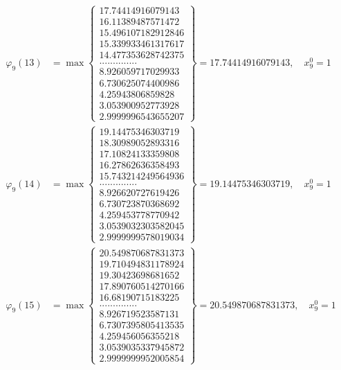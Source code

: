 \documentclass{article}
\begin{document}
\begin{align*}
  
  
  
\varphi_{9}(13) &= \max \left\{ \begin{array}{c}
17.74414916079143 \\
 16.11389487571472 \\
 15.496107182912846 \\
 15.339933461317617 \\
 14.477353628742375 \\
 .............. \\
 8.926059717029933 \\
 6.730625074400986 \\
 4.25943806859828 \\
 3.053900952773928 \\
 2.9999996543655207
\end{array} \right\} = 17.74414916079143, \quad x_{9}^0 = 1\\
  
  
  
  
\varphi_{9}(14) &= \max \left\{ \begin{array}{c}
19.14475346303719 \\
 18.30989052893316 \\
 17.10824133359808 \\
 16.27862636358493 \\
 15.743214249564936 \\
 .............. \\
 8.926620727619426 \\
 6.730723870368692 \\
 4.259453778770942 \\
 3.0539032303582045 \\
 2.9999999578019034
\end{array} \right\} = 19.14475346303719, \quad x_{9}^0 = 1\\
  
  
  
  
\varphi_{9}(15) &= \max \left\{ \begin{array}{c}
20.549870687831373 \\
 19.710494831178924 \\
 19.30423698681652 \\
 17.890760514270166 \\
 16.68190715183225 \\
 .............. \\
 8.926719523587131 \\
 6.7307395805413535 \\
 4.259456056355218 \\
 3.0539035337945872 \\
 2.9999999952005854
\end{array} \right\} = 20.549870687831373, \quad x_{9}^0 = 1\\
  

\end{align*}
\end{document}
